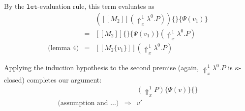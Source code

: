 \documentclass[a4paper,11pt,draft]{article}
\newcommand{\kw}[1]{\mathtt{#1}}
\begin{document}
\begin{description}
By the $\kw{let}$-evaluation rule, this term evaluates as
\begin{eqnarray*}
                 &   & ([\![M_{2}]\!](\Uparrow_{x}^{1} \lambda^{0}.P))\{\}\{\Psi(v_{1})\} \\
                 & = & [\![M_{2}]\!]\{\}\{\Psi(v_{1})\}(\Uparrow_{x}^{1} \lambda^{0}.P) \\
\mbox{(lemma 4)} & = & [\![M_{2}\{v_{1}\}]\!](\Uparrow_{x}^{1} \lambda^{0}.P)
\end{eqnarray*}

Applying the induction hypothesis to the second premise (again, $\Uparrow_{x}^{1} \lambda^{0}.P$ is $\kappa$-closed)
completes our argument:
\begin{eqnarray*}
                               &             & (\Uparrow_{x}^{1}P)\{\Psi(v)\}\{\} \\
\mbox{(assumption and \ldots)} & \Rightarrow & v'
\end{eqnarray*}



\end{description}




\end{document}
